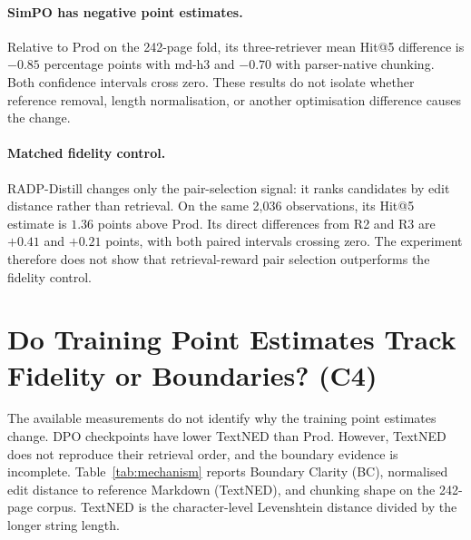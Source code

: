 \documentclass[11pt]{article}
\newcommand{\contribTraining}{C4}
\begin{document}
\paragraph{SimPO has negative point estimates.} Relative to Prod on the 242-page fold, its three-retriever mean Hit@5 difference is $-0.85$ percentage points with md-h3 and $-0.70$ with parser-native chunking. Both confidence intervals cross zero. These results do not isolate whether reference removal, length normalisation, or another optimisation difference causes the change.

\paragraph{Matched fidelity control.} RADP-Distill changes only the pair-selection signal: it ranks candidates by edit distance rather than retrieval. On the same 2{,}036 observations, its Hit@5 estimate is $1.36$ points above Prod. Its direct differences from R2 and R3 are $+0.41$ and $+0.21$ points, with both paired intervals crossing zero. The experiment therefore does not show that retrieval-reward pair selection outperforms the fidelity control.

\section{Do Training Point Estimates Track Fidelity or Boundaries? (\contribTraining)}
\label{app:mechanism}

The available measurements do not identify why the training point estimates change. DPO checkpoints have lower TextNED than Prod. However, TextNED does not reproduce their retrieval order, and the boundary evidence is incomplete. Table~\ref{tab:mechanism} reports Boundary Clarity (BC), normalised edit distance to reference Markdown (TextNED), and chunking shape on the 242-page corpus. TextNED is the character-level Levenshtein distance divided by the longer string length.
\end{document}
